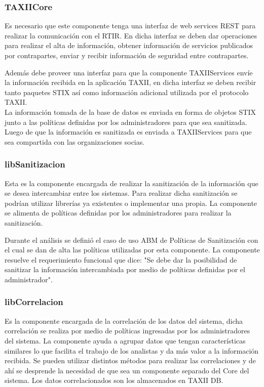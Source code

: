 	\subsubsection{TAXIICore}
	Es necesario que este componente tenga una interfaz de web services REST para realizar la
		comunicación con el RTIR. En dicha interfaz se deben dar operaciones para realizar el alta de información, obtener
		información de servicios publicados por contrapartes, enviar y recibir información de seguridad entre contrapartes.\\
		\bigskip

	Además debe proveer una interfaz para que la componente TAXIIServices envíe la información
		recibida en la aplicación TAXII, en dicha interfaz se deben recibir tanto paquetes STIX así como información adicional
		utilizada por el protocolo TAXII. \\
	\bigskip	
	La información tomada de la base de datos es enviada en forma de objetos STIX junto a las
		políticas definidas por los administradores para que sea sanitizada. Luego de que la información es sanitizada es
		enviada a TAXIIServices para que sea compartida con las organizaciones socias.
	
	\subsubsection{libSanitizacion}
	Esta es la componente encargada de realizar la sanitización de la información que se desea
		intercambiar entre los sistemas. Para realizar dicha sanitización se podrían utilizar librerías ya existentes o implementar una
		propia. La componente se alimenta de políticas definidas por los administradores para realizar la
		sanitización. 

		Durante el análisis se definió el caso de uso ABM de Políticas de Sanitización con el cual se dan de alta las políticas utilizadas por esta componente. La componente resuelve el requerimiento funcional que dice: "Se debe dar la posibilidad de sanitizar la información intercambiada por medio de políticas definidas por el administrador".
	
	\subsubsection{libCorrelacion}
	Es la componente encargada de la correlación de los datos del sistema, dicha correlación se
		realiza por medio de políticas ingresadas por los administradores del sistema. La componente ayuda a agrupar datos que
		tengan características similares lo que facilita el trabajo de los analistas y da más valor a la información recibida.
		Se pueden utilizar distintos métodos para realizar las correlaciones y de ahí se desprende la necesidad de que sea un
		componente separado del Core del sistema. Los datos correlacionados son los almacenados en TAXII DB.

